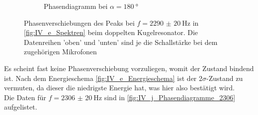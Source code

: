 \documentclass[../main.tex]{subfiles}
\begin{document}
\begin{figure}[H]
\begin{subfigure}[b]{0.45\textwidth}
                \caption{Phasendiagramm bei $\alpha=\SI{180}{\degree}$}
                \label{fig:IV_j_Phasen2205_180Grad}
            \end{subfigure}
            \caption{Phasenverschiebungen des Peaks bei $f=\SI{2290(20)}{\hertz}$ in \ref{fig:IV_e_Spektren} beim doppelten Kugelresonator. Die Datenreihen 'oben' und 'unten' sind je die Schallstärke bei dem zugehörigen Mikrofonen}
            \label{fig:IV_j_Phasendiagramme_2290}
        \end{figure}

        Es scheint fast keine Phasenverschiebung vorzuliegen, womit der Zustand bindend ist. Nach dem Energieschema \ref{fig:IV_e_Energieschema} ist der $2\sigma$-Zustand zu vermuten, da dieser die niedrigste Energie hat, was hier also bestätigt wird.\\
        
        Die Daten für $f=\SI{2306(20)}{\hertz}$ sind in \ref{fig:IV_j_Phasendiagramme_2306} aufgelistet.
\end{document}
